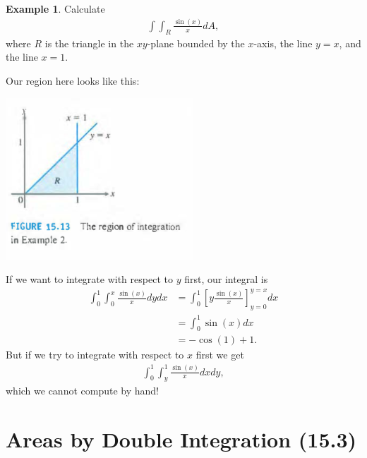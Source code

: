 \documentclass[12pt, letter]{article}
\theoremstyle{plain}
\numberwithin{theorem}{section}
\theoremstyle{definition}
\newtheorem{example}[theorem]{Example}
\begin{document}
\begin{example}
Calculate 
\begin{align*}
\int \int_R \frac{\sin(x)}{x}dA,
\end{align*}
where $R$ is the triangle in the $xy$-plane bounded by the $x$-axis, the line $y=x$, and the line $x=1$.

\bigskip

Our region here looks like this:

\bigskip

\begin{center}
\includegraphics[scale=0.7]{m3_f7}
\end{center}

\bigskip

If we want to integrate with respect to $y$ first, our integral is
\begin{align*}
\int_0^1 \int_0^x \frac{\sin(x)}{x} dy dx &= \int_0^1 \left[y\frac{\sin(x)}{x}\right]_{y=0}^{y=x} dx\\
&=\int_0^1 \sin(x)dx\\
&=-\cos(1)+1.
\end{align*}
But if we try to integrate with respect to $x$ first we get
\begin{align*}
\int_0^1 \int_y^1 \frac{\sin(x)}{x}dxdy,
\end{align*}
which we cannot compute by hand!

\end{example}

\newpage


\section{Areas by Double Integration (15.3)}
\end{document}
